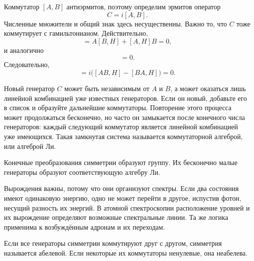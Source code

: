 Коммутатор \([A,B]\) антиэрмитов, поэтому определим эрмитов оператор
\begin{equation}
C=i[A,B].
\end{equation}
Численные множители и общий знак здесь несущественны. Важно то, что \(C\) тоже коммутирует с гамильтонианом. Действительно,
\begin{equation}
[AB,H]
=A[B,H]+[A,H]B=0,
\end{equation}
и аналогично
\begin{equation}
[BA,H]=0.
\end{equation}
Следовательно,
\begin{equation}
[C,H]
=i\bigl([AB,H]-[BA,H]\bigr)=0.
\end{equation}

Новый генератор \(C\) может быть независимым от \(A\) и \(B\), а может оказаться лишь линейной комбинацией уже известных генераторов. Если он новый, добавьте его в список и образуйте дальнейшие коммутаторы. Повторение этого процесса может продолжаться бесконечно, но часто он замыкается после конечного числа генераторов: каждый следующий коммутатор является линейной комбинацией уже имеющихся. Такая замкнутая система называется коммутаторной алгеброй, или алгеброй Ли.

Конечные преобразования симметрии образуют группу. Их бесконечно малые генераторы образуют соответствующую алгебру Ли.

Вырождения важны, потому что они организуют спектры. Если два состояния имеют одинаковую энергию, одно не может перейти в другое, испустив фотон, несущий разность их энергий. В атомной спектроскопии расположение уровней и их вырождение определяют возможные спектральные линии. Та же логика применима к возбуждённым адронам и их переходам.

\begin{classroomqa}
\end{classroomqa}

Если все генераторы симметрии коммутируют друг с другом, симметрия называется абелевой. Если некоторые их коммутаторы ненулевые, она неабелева.

\begin{classroomqa}
\end{classroomqa}

